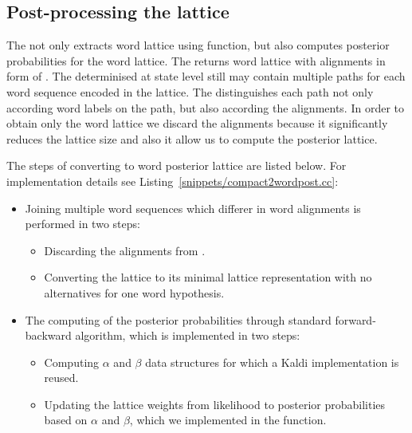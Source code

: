 \subsection{Post-processing the lattice}
\label{sec:postprocess}
The  not only extracts word lattice using  function, but also computes posterior probabilities for the word lattice.
The  returns word lattice with alignments in form of .
The  determinised at state level still may contain multiple paths for each word sequence encoded in the lattice.
The  distinguishes each path not only according word labels on the path, but also according the alignments.
In order to obtain only the word lattice we discard the alignments because it significantly reduces the lattice size and also it allow us to compute the posterior lattice.

%


The steps of converting  to word posterior lattice are listed below. For implementation details see Listing~\ref{snippets/compact2wordpost.cc}:
\begin{itemize}
    \item Joining multiple word sequences which differer in word alignments is performed in two steps:
    \begin{itemize}
        \item Discarding the alignments from .
        \item Converting the lattice to its minimal lattice representation with no alternatives for one word hypothesis. 
    \end{itemize}
    \item The computing of the posterior probabilities through standard forward-backward algorithm, which is implemented in two steps:
    \begin{itemize}
        \item Computing $\alpha$ and $\beta$ data structures for which a Kaldi implementation is reused.
        \item Updating the lattice weights from likelihood to posterior probabilities based on $\alpha$ and $\beta$, which we implemented in the  function.
    \end{itemize}
\end{itemize}

